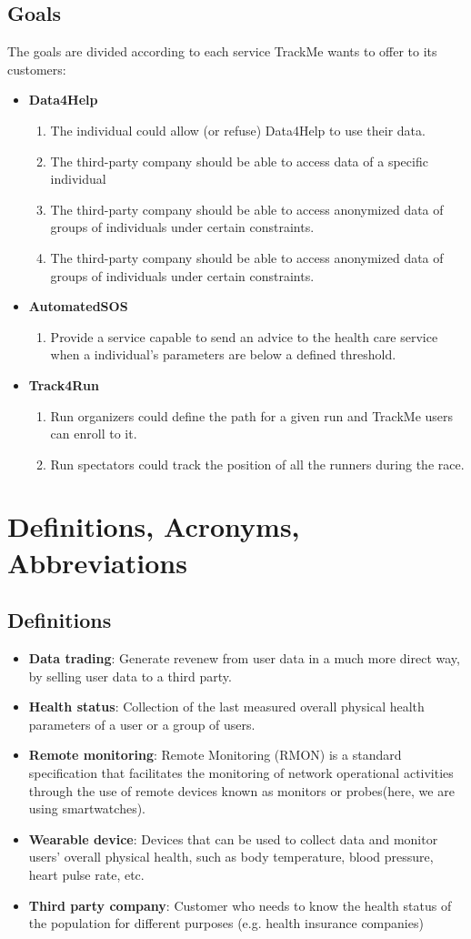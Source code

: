 \documentclass[12pt]{report}
\newcommand\goal[1]{\item[{[G#1]}] }
\begin{document}
\subsection{Goals}
The goals are divided according to each service TrackMe wants to offer to its customers:
\begin{itemize}
\item{\textbf{Data4Help}}
\begin{enumerate}
\goal{1} The individual could allow (or refuse) Data4Help to use their data.
\goal{2} The third-party company should be able to access data of a specific individual
\goal{3} The third-party company should be able to access anonymized data of groups of individuals under certain constraints.
\goal{4} The third-party company should be able to access anonymized data of groups of individuals under certain constraints.
\end{enumerate}

\item{\textbf{AutomatedSOS}}
\begin{enumerate}
\goal{5} Provide a service capable to send an advice to the health care service when a individual’s parameters are below a defined threshold.
\end{enumerate}

\item{\textbf{Track4Run}}
\begin{enumerate}
\goal{6} Run organizers could define the path for a given run and TrackMe users can enroll to it.
\goal{7} 
Run spectators could track the position of all the runners during the race.
\end{enumerate}
\end{itemize}

\section{Definitions, Acronyms, Abbreviations}
\subsection{Definitions}
\begin{itemize}
\item{\textbf{Data trading}}: Generate revenew from user data in a much more direct way, by selling user data to a third party.
\item{\textbf{Health status}}: Collection of the last measured overall physical health parameters of a user or a group of users.
\item{\textbf{Remote monitoring}}: Remote Monitoring (RMON) is a standard specification that facilitates the monitoring of network operational activities through the use of remote devices known as monitors or probes(here, we are using smartwatches).
\item{\textbf{Wearable device}}: Devices that can be used to collect data and monitor users' overall physical health, such as body temperature, blood pressure, heart pulse rate, etc.
\item{\textbf{Third party company}}: Customer who needs to know the health status of the population for different purposes (e.g. health insurance companies)
\end{itemize}
\end{document}
